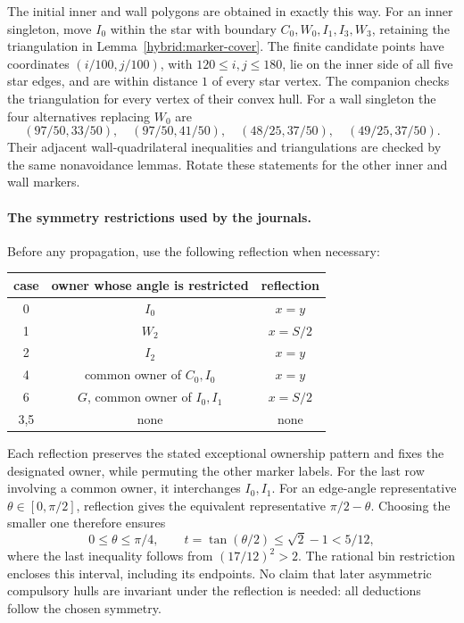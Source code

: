 \documentclass[11pt]{article}
\begin{document}
The initial inner and wall polygons are obtained in exactly this way.
For an inner singleton, move $I_0$ within the star with boundary
$C_0,W_0,I_1,I_3,W_3$, retaining the triangulation in
Lemma~\ref{hybrid:marker-cover}. The finite candidate points have coordinates
$(i/100,j/100)$, with $120\le i,j\le180$, lie on the inner side of all
five star edges, and are within distance $1$ of every star vertex.
The companion checks the triangulation for every vertex of their convex
hull. For a wall singleton the four alternatives replacing $W_0$ are
\[
 (97/50,33/50),\quad(97/50,41/50),\quad
 (48/25,37/50),\quad(49/25,37/50).
\]
Their adjacent wall-quadrilateral inequalities and triangulations are
checked by the same nonavoidance lemmas. Rotate these statements for the
other inner and wall markers.

\paragraph{The symmetry restrictions used by the journals.}
Before any propagation, use the following reflection when necessary:
\begin{center}
\begin{tabular}{c|c|c}
case&owner whose angle is restricted&reflection\\ \hline
0&$I_0$&$x=y$\\
1&$W_2$&$x=S/2$\\
2&$I_2$&$x=y$\\
4&common owner of $C_0,I_0$&$x=y$\\
6&$G$, common owner of $I_0,I_1$&$x=S/2$\\
3,5&none&none
\end{tabular}
\end{center}
Each reflection preserves the stated exceptional ownership pattern and
fixes the designated owner, while permuting the other marker labels.
For the last row involving a common owner, it interchanges $I_0,I_1$.
For an edge-angle representative $\theta\in[0,\pi/2]$, reflection gives
the equivalent representative $\pi/2-\theta$. Choosing the smaller one
therefore ensures
\[
 0\le\theta\le\pi/4,\qquad
 t=\tan(\theta/2)\le\sqrt2-1<5/12,
\]
where the last inequality follows from $(17/12)^2>2$.
The rational bin restriction encloses this interval, including its
endpoints. No claim that later asymmetric compulsory hulls are invariant
under the reflection is needed: all deductions follow the chosen symmetry.
\end{document}
